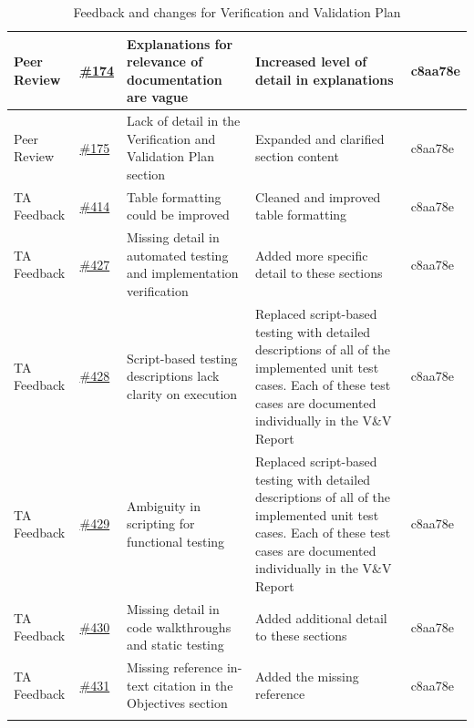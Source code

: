 \documentclass{article}
\begin{document}
{\begin{xltabular}{\textwidth}{>{\raggedright\arraybackslash}X >{\raggedright\arraybackslash}p{0.8cm} >{\raggedright\arraybackslash}X >{\raggedright\arraybackslash}X >{\raggedright\arraybackslash}p{2.0cm}}
Peer Review & \href{https://github.com/M9Huynh/technically-functional/issues/174}{\#174} & Explanations for relevance of documentation are vague & Increased level of detail in explanations & c8aa78e \\
\midrule
 
Peer Review & \href{https://github.com/M9Huynh/technically-functional/issues/175}{\#175} & Lack of detail in the Verification and Validation Plan section & Expanded and clarified section content & c8aa78e \\
\midrule
 
TA Feedback & \href{https://github.com/M9Huynh/technically-functional/issues/414}{\#414} & Table formatting could be improved & Cleaned and improved table formatting & c8aa78e \\
\midrule
 
TA Feedback & \href{https://github.com/M9Huynh/technically-functional/issues/427}{\#427} & Missing detail in automated testing and implementation verification & Added more specific detail to these sections & c8aa78e \\
\midrule
 
TA Feedback & \href{https://github.com/M9Huynh/technically-functional/issues/428}{\#428} & Script-based testing descriptions lack clarity on execution & Replaced script-based testing with detailed descriptions of all of the implemented unit test cases. Each of these test cases are documented individually in the V\&V Report & c8aa78e \\
\midrule
 
TA Feedback & \href{https://github.com/M9Huynh/technically-functional/issues/429}{\#429} & Ambiguity in scripting for functional testing & Replaced script-based testing with detailed descriptions of all of the implemented unit test cases. Each of these test cases are documented individually in the V\&V Report & c8aa78e \\
\midrule
 
TA Feedback & \href{https://github.com/M9Huynh/technically-functional/issues/430}{\#430} & Missing detail in code walkthroughs and static testing & Added additional detail to these sections & c8aa78e \\
\midrule
 
TA Feedback & \href{https://github.com/M9Huynh/technically-functional/issues/431}{\#431} & Missing reference in-text citation in the Objectives section & Added the missing reference & c8aa78e \\
 
 
\bottomrule
\caption{Feedback and changes for Verification and Validation Plan}
\label{tab:vnv_feedback}
\end{xltabular}
}
 
\end{document}
